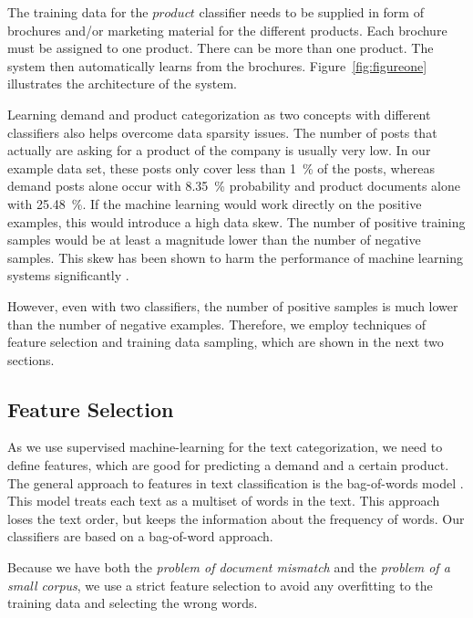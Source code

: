 The training data for the $product$ classifier needs to be supplied in form of brochures and/or marketing material for the different products.
Each brochure must be assigned to one product.
There can be more than one product.
The system then automatically learns from the brochures.
Figure~\ref{fig:figureone} illustrates the architecture of the system.

Learning demand and product categorization as two concepts with different classifiers also helps overcome data sparsity issues.
The number of posts that actually are asking for a product of the company is usually very low.
In our example data set, these posts only cover less than 1~\% of the posts, whereas demand posts alone occur with 8.35~\% probability and product documents alone with 25.48~\%.
If the machine learning would work directly on the positive examples, this would introduce a high data skew.
The number of positive training samples would be at least a magnitude lower than the number of negative samples.
This skew has been shown to harm the performance of machine learning systems significantly \cite{monard2002learning,guo2008class}.

However, even with two classifiers, the number of positive samples is much lower than the number of negative examples.
Therefore, we employ techniques of feature selection and training data sampling, which are shown in the next two sections.

\subsection{Feature Selection}
\label{sec:feature-selection}
As we use supervised machine-learning for the text categorization, we need to define features, which are good for predicting a demand and a certain product.
The general approach to features in text classification is the bag-of-words model \cite{yang1997comparative,zhang2010understanding}.
This model treats each text as a multiset of words in the text.
This approach loses the text order, but keeps the information about the frequency of words.
Our classifiers are based on a bag-of-word approach.

Because we have both the \emph{problem of document mismatch} and the \emph{problem of a small corpus}, we use a strict feature selection to avoid any overfitting to the training data and selecting the wrong words.

